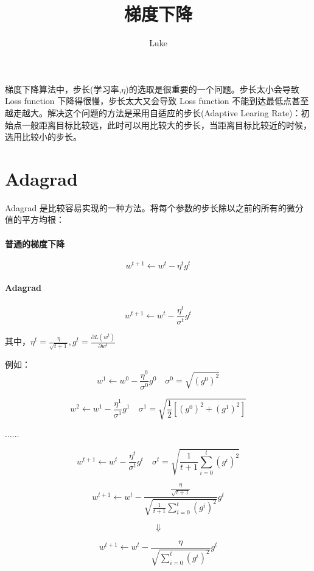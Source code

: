\documentclass[UTF8,a4paper]{article}
\title{梯度下降}
\author{Luke}
\begin{document}
\maketitle

梯度下降算法中，步长(学习率,$\eta$)的选取是很重要的一个问题。步长太小会导致 Loss function 下降得很慢，步长太大又会导致 Loss function 不能到达最低点甚至越走越大。解决这个问题的方法是采用自适应的步长(Adaptive Learing Rate)：初始点一般距离目标比较远，此时可以用比较大的步长，当距离目标比较近的时候，选用比较小的步长。

\section{Adagrad}

Adagrad 是比较容易实现的一种方法。将每个参数的步长除以之前的所有的微分值的平方均根：

\paragraph{普通的梯度下降}
\begin{equation}
w^{t+1}\leftarrow w^{t}-\eta^t g^t
\end{equation}

\paragraph{Adagrad}
\begin{equation}
w^{t+1}\leftarrow w^t- \frac{\eta^t}{\sigma^t}g^t
\end{equation}

其中，$\eta^t=\frac{\eta}{\sqrt{t+1}},g^t=\frac{\partial L(w^t)}{\partial w^t}$

例如：
\[w^1\leftarrow w^0-\frac{\eta^0}{\sigma^0} g^0 \quad \sigma^0=\sqrt{(g^0)^2}\]

\[w^2\leftarrow w^1-\frac{\eta^1}{\sigma^1}g^1 \quad \sigma^1=\sqrt{\frac{1}{2}[(g^0)^2+(g^1)^2]}  \]

\begin{center}
$\dots\dots$
\end{center}

\[w^{t+1}\leftarrow w^t-\frac{\eta^t}{\sigma^t}g^t \quad \sigma^t=\sqrt{\frac{1}{t+1}\sum^t_{i=0}(g^i)^2}\]

\[w^{t+1}\leftarrow w^t-\frac{\frac{\eta}{\sqrt{t+1}}}{\sqrt{\frac{1}{t+1}\sum^t_{i=0}(g^i)^2}}g^t\]


\[\Downarrow\]
 

\begin{equation}
w^{t+1}\leftarrow w^t-\frac{\eta}{\sqrt{\sum^t_{i=0}(g^i)^2}}g^t
\end{equation}
\end{document}
